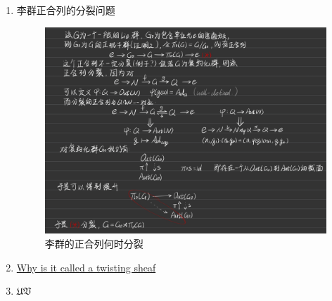 \begin{enumerate}
    \item 李群正合列的分裂问题
    \begin{figure}[htpb]
        \centering
        \includegraphics[scale = 0.18]{Figures/20240926-223647.jpg}
        \caption{李群的正合列何时分裂}
    \end{figure}
    \item \href{https://twistedcubic.wordpress.com/2009/01/23/why-is-it-called-a-twisting-sheaf/}{Why is it called a twisting sheaf}
    \item $\mathfrak{U V}$
\end{enumerate}
